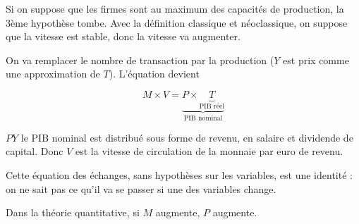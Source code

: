 	Si on suppose que les firmes sont au maximum des capacités de production, la 3ème hypothèse tombe. Avec la définition classique et néoclassique, on suppose que la vitesse est stable, donc la vitesse va augmenter.
	
	On va remplacer le nombre de transaction par la production ($Y$ est prix comme une approximation de $T$). L'équation devient
	
	$$M \times V = \underbrace{P \times \underbrace{T}_{\text{PIB réel}}}_{\text{PIB nominal}}$$
	
	$PY$ le PIB nominal est distribué sous forme de revenu, en salaire et dividende de capital. Donc $V$ est la vitesse de circulation de la monnaie par euro de revenu.
	
	Cette équation des échanges, sans hypothèses sur les variables, est une identité : on ne sait pas ce qu'il va se passer si une des variables change.
	
	Dans la théorie quantitative, si $M$ augmente, $P$ augmente.